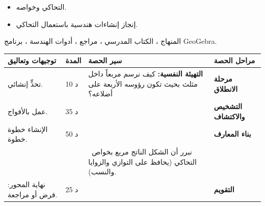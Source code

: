 \documentclass[12pt,a4paper]{article}
\newenvironment{LTR}{\begin{otherlanguage}{english}}{\end{otherlanguage}}
\newcommand{\ar}[1]{\foreignlanguage{arabic}{#1}}
\newcommand{\Phase}[1]{\textbf{#1}}
\newenvironment{Sayr}{%
\begin{LTR}\renewcommand{\arraystretch}{1.25}
\begin{longtable}{|p{0.17\textwidth}|>{\centering\arraybackslash}p{0.06\textwidth}|p{0.53\textwidth}|>{\centering\arraybackslash}p{0.12\textwidth}|}
\hline\rowcolor{cThm!12}\ar{\textbf{توجيهات وتعاليق}} & \ar{\textbf{المدة}} & \ar{\textbf{سير الحصة}} & \ar{\textbf{مراحل الحصة}}\\\hline\endhead
\hline\endfoot}{\end{longtable}\end{LTR}}
\newcommand{\Row}[4]{\ar{\small #4} & \ar{#3} & \ar{#2} & \cellcolor{cThm!8}\ar{\Phase{#1}}\\\hline}
\newcommand{\Lab}[2]{\foreignlanguage{english}{\tcbox[on line,colback=#1,colframe=#1,boxrule=0pt,arc=2pt,boxsep=1pt,left=5pt,right=5pt,top=1pt,bottom=1pt]{\ar{\textcolor{white}{\textbf{#2}}}}}}
\newcommand{\ck}{\ensuremath{{\color{cRem}\checkmark}}}
\begin{document}
{\begin{itemize}\item التحاكي وخواصه.\end{itemize}}%
{\begin{itemize}\item إنجاز إنشاءات هندسية باستعمال التحاكي.\end{itemize}}%
{المنهاج ، الكتاب المدرسي ، مراجع ، أدوات الهندسة ، برنامج GeoGebra.}
\begin{Sayr}
\Row{مرحلة الانطلاق}{%
\textbf{التهيئة النفسية:} كيف نرسم مربعاً داخل مثلث بحيث تكون رؤوسه الأربعة على أضلاعه؟}{10 د}{تحدٍّ إنشائي.}
\Row{التشخيص والاكتشاف}{%
\Lab{cEx}{وضعية مقترحة}\ $ABC$ مثلث. نريد مربعاً $MNPQ$ حيث $M$ و $N$ على $[BC]$ ، $P\in[AC]$ ، $Q\in[AB]$.\par\ck\ نرسم أولاً مربعاً «مساعداً» $M_0N_0P_0Q_0$ له ضلع على $[BC]$ ورأس $Q_0$ على $[AB]$ (دون شرط على $P_0$).\par
}{35 د}{عمل بالأفواج.}
\Row{بناء المعارف}{%
\Lab{cMeth}{الإنشاء}\par\ck\ التحاكي الذي مركزه $B$ يحول المربع المساعد إلى مربع ، ويحافظ على $[BC]$ و $[BA]$.\par
\ck\ المستقيم $(BP_0)$ يقطع $[AC]$ في $P$: هو رأس المربع المطلوب.\par
\ck\ نكمل: $Q$ على $[AB]$ بحيث $(PQ)\parallel(BC)$ ، ثم المسقطان العموديان $M$ و $N$.\par
\Lab{cRem}{ملاحظات}\ فكرة الطريقة: ننشئ شكلاً يحقق كل الشروط إلا شرطاً واحداً ، ثم نستعمل تحاكياً.\par}{50 د}{الإنشاء خطوة خطوة.}
\Row{}{%
\Lab{cThm!80!black}{حذار}\ نبرر أن الشكل الناتج مربع بخواص التحاكي (يحافظ على التوازي والزوايا والنسب).}{}{}
\Row{التقويم}{%
\Lab{cEx}{تطبيق}\par $(C)$ دائرة و $(\Delta)$ مستقيم يقطعها. أنشئ مربعاً له ضلع على $(\Delta)$ ورأسان على $(C)$ ، واشرح الطريقة.\par\textbf{الحل المنتظر:} $H$ المسقط العمودي لمركز الدائرة على $(\Delta)$ ؛ مربع مساعد ضلعه على $(\Delta)$ ومنتصف هذا الضلع $H$ ، ثم التحاكي الذي مركزه $H$ ويرسل رأسه العلوي إلى الدائرة (المستقيم من $H$ نحو الرأس يقطع الدائرة).\par\textbf{واجب منزلي:} تمارين 50 ، 51 ، 52 من باب التحويلات.\par\smallskip\textbf{ملاحظات حول سير الحصة:} \dotfill}{25 د}{نهاية المحور: فرض أو مراجعة.}
\end{Sayr}
\end{document}
